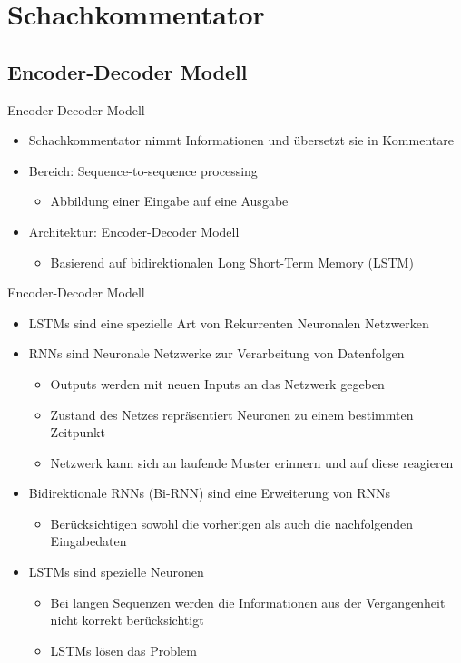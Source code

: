 \section{Schachkommentator}

\subsection{Encoder-Decoder Modell}

\begin{frame}{Encoder-Decoder Modell}
\begin{itemize}
	\item Schachkommentator nimmt Informationen und übersetzt sie in Kommentare
	\item Bereich: Sequence-to-sequence processing
	\begin{itemize}
		\item Abbildung einer Eingabe auf eine Ausgabe
	\end{itemize}
	\item Architektur: Encoder-Decoder Modell
	\begin{itemize}
		\item Basierend auf bidirektionalen Long Short-Term Memory (LSTM)
	\end{itemize}
\end{itemize}
\end{frame}




\begin{frame}{Encoder-Decoder Modell}
\begin{itemize}
	\item LSTMs sind eine spezielle Art von Rekurrenten Neuronalen Netzwerken
	\item RNNs sind Neuronale Netzwerke zur Verarbeitung von Datenfolgen
	\begin{itemize}
		\item Outputs werden mit neuen Inputs an das Netzwerk gegeben
		\item Zustand des Netzes repräsentiert Neuronen zu einem bestimmten Zeitpunkt
		\item Netzwerk kann sich an laufende Muster erinnern und auf diese reagieren
	\end{itemize}
	\item Bidirektionale RNNs (Bi-RNN) sind eine Erweiterung von RNNs
	\begin{itemize}
		\item Berücksichtigen sowohl die vorherigen als auch die nachfolgenden Eingabedaten
	\end{itemize}
	\item LSTMs sind spezielle Neuronen
	\begin{itemize}
		\item Bei langen Sequenzen werden die Informationen aus der Vergangenheit nicht korrekt berücksichtigt
		\item LSTMs lösen das Problem
	\end{itemize}
\end{itemize}
\end{frame}




